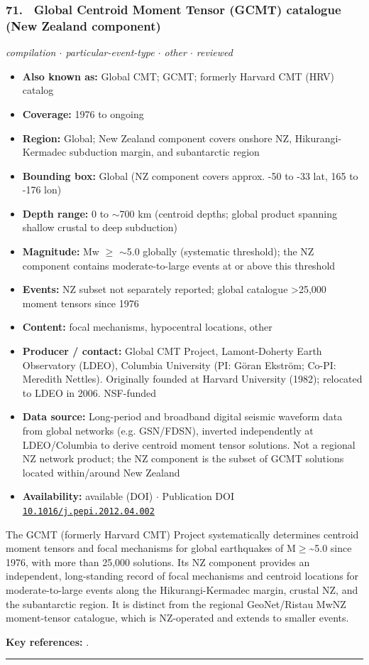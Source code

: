 \documentclass[10pt,a4paper]{article}
\newcommand{\catentryrule}{\par\vspace{3pt}\noindent\textcolor{rulegrey}{\rule{\linewidth}{0.3pt}}\par\vspace{5pt}}
\newcommand{\kv}[2]{\item \textbf{#1:} #2}
\begin{document}
\subsubsection*{\hypertarget{c:71}{71.}~ Global Centroid Moment Tensor (GCMT) catalogue (New Zealand component)}
{\small\itshape compilation $\cdot$ particular-event-type $\cdot$ other $\cdot$ reviewed}\par\vspace{2pt}
\begin{itemize}[leftmargin=1.3em,itemsep=0.6pt,topsep=1pt,parsep=0pt]
\kv{Also known as}{Global CMT; GCMT; formerly Harvard CMT (HRV) catalog}
\kv{Coverage}{1976 to ongoing}
\kv{Region}{Global; New Zealand component covers onshore NZ, Hikurangi-Kermadec subduction margin, and subantarctic region}
\kv{Bounding box}{Global (NZ component covers approx. -50 to -33 lat, 165 to -176 lon)}
\kv{Depth range}{0 to $\sim$700 km (centroid depths; global product spanning shallow crustal to deep subduction)}
\kv{Magnitude}{Mw $\geq$ $\sim$5.0 globally (systematic threshold); the NZ component contains moderate-to-large events at or above this threshold}
\kv{Events}{NZ subset not separately reported; global catalogue \textgreater{}25,000 moment tensors since 1976}
\kv{Content}{focal mechanisms, hypocentral locations, other}
\kv{Producer / contact}{Global CMT Project, Lamont-Doherty Earth Observatory (LDEO), Columbia University (PI: Göran Ekström; Co-PI: Meredith Nettles). Originally founded at Harvard University (1982); relocated to LDEO in 2006. NSF-funded}
\kv{Data source}{Long-period and broadband digital seismic waveform data from global networks (e.g. GSN/FDSN), inverted independently at LDEO/Columbia to derive centroid moment tensor solutions. Not a regional NZ network product; the NZ component is the subset of GCMT solutions located within/around New Zealand}
\kv{Availability}{available (DOI) $\cdot$ Publication DOI \href{https://doi.org/10.1016/j.pepi.2012.04.002}{\nolinkurl{10.1016/j.pepi.2012.04.002}}}
\end{itemize}
\par\vspace{2pt}The GCMT (formerly Harvard CMT) Project systematically determines centroid moment tensors and focal mechanisms for global earthquakes of M$\geq$\textasciitilde{}5.0 since 1976, with more than 25,000 solutions. Its NZ component provides an independent, long-standing record of focal mechanisms and centroid locations for moderate-to-large events along the Hikurangi-Kermadec margin, crustal NZ, and the subantarctic region. It is distinct from the regional GeoNet/Ristau MwNZ moment-tensor catalogue, which is NZ-operated and extends to smaller events.
\par\vspace{2pt}\textbf{Key references:} \cite{Ekstrm2012,Dziewonski1981}.
\catentryrule
\end{document}
